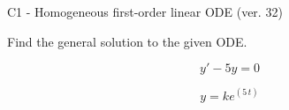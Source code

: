 \begin{exercise}
  \begin{exerciseTitle}C1 - Homogeneous first-order linear ODE (ver. 32)\end{exerciseTitle}
  \begin{exerciseStatement}
    
Find the general solution to the given ODE.

    
\[y'-5y=0\]

  \end{exerciseStatement}
  \begin{exerciseAnswer}
    
\[y= k e^{\left(5 \, t\right)}\]

  \end{exerciseAnswer}
\end{exercise}